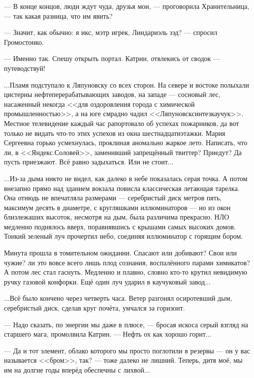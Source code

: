 

--- В конце концов, люди ждут чуда, друзья мои, --- проговорила Хранительница, --- так какая разница, что им явить?

--- Значит, как обычно: я икс, мэтр игрек, Линдариэль зэд? --- спросил Громостонко.

--- Именно так. Спешу открыть портал. Катрин, отвлекись от сводок --- путеводствуй!

\emptypar

...Пламя подступало к Ляпуновску со всех сторон. На севере и востоке полыхали цистерны нефтеперерабатывающих заводов,
на западе --- сосновый лес, насаженный некогда <<для оздоровления города с химической промышленностью>>,
а на юге смрадно чадил <<Ляпуновсксинтезкаучук>>.
Местное телевидение каждый час рапортовало об успехах пожарников,
да вот только не видать что-то этих успехов из окна шестнадцатиэтажки.
Мария Сергеевна горько усмехнулась, проклиная аномально жаркое лето.
Написать, что ли, в <<Яндекс.Соловей>>, заменивший запрещённый твиттер? Приедут? Да пусть приезжают.
Всё равно задыхаться. Или не стоит...

...Из-за дыма никто не видел, как далеко в небе показалась серая точка.
А потом внезапно прямо над зданием вокзала повисла классическая летающая тарелка.
Она отнюдь не впечатляла размерами --- серебристый диск метров пять, максимум десять в диаметре,
с кругляшками иллюминаторов --- но из окон близлежаших высоток, несмотря на дым, была различима прекрасно.
НЛО медленно поднялось вверх, поравнявшись с крышами самых высоких домов.
Тонкий зеленый луч прочертил небо, соединяя иллюминатор с горящим бором.

Минута прошла в томительном ожидании. Спасают или добивают? Свои или чужие?
ли это вовсе всего лишь плод сознания, воспалённого парами химикатов? А потом лес стал гаснуть.
Медленно и плавно, словно кто-то крутил невидимую ручку газовой конфорки. Ещё один луч ударил в каучуковый завод...

...Всё было кончено через четверть часа. Ветер разгонял осиротевший дым, серебристый диск, сделав круг почёта,
умчался за горизонт.


\emptypar


--- Надо сказать, по энергии мы даже в плюсе, --- бросая искоса серый взгляд на старшего мага, промолвила Катрин.
--- Нефть ох как хорошо горит...

--- Да и тот элемент, облако которого мы просто поглотили в резервы --- он у вас называется <<бром>>, так?
--- тоже далеко не лишний. Теперь, дитя моё, мы им на долгие годы вперёд обеспечны с лихвой...



